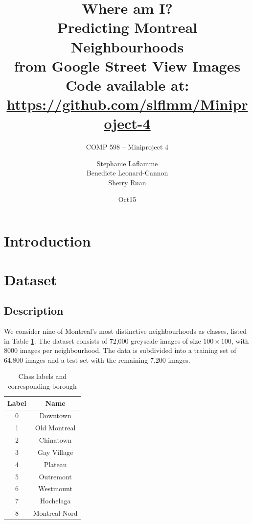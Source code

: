 \documentclass{acm_proc_article-sp}
\begin{document}
\title{Where am I? \\ Predicting Montreal Neighbourhoods \\from Google Street View Images  \\
{\normalsize Code available at: \url{https://github.com/slflmm/Miniproject-4}}} 
\subtitle{COMP 598 -- Miniproject 4}

\author{
\alignauthor 
Stephanie Laflamme\\
\alignauthor
Benedicte Leonard-Cannon\\
\alignauthor Sherry Ruan\\
}

\date{Oct15}



\maketitle
\begin{abstract}
\end{abstract}

\section{Introduction}%

\section{Dataset}

\subsection{Description}
We consider nine of Montreal's most distinctive neighbourhoods as classes, listed in Table \ref{tbl:boroughlist}. The dataset consists of 72,000 greyscale images of size $100\times100$, with 8000 images per neighbourhood. The data is subdivided into a training set of 64,800 images and a test set with the remaining 7,200 images. 

\begin{table}[h!]
\caption{Class labels and corresponding borough}
\label{tbl:boroughlist}
\centering
\begin{tabular}{| c | c |}
\hline
\textbf{Label} & \textbf{Name} \\ \hline 
0 & Downtown \\
1 & Old Montreal \\
2 & Chinatown \\
3 & Gay Village \\
4 & Plateau \\
5 & Outremont \\
6 & Westmount \\
7 & Hochelaga \\
8 & Montreal-Nord \\ \hline
\end{tabular}
\end{table}
\end{document}
